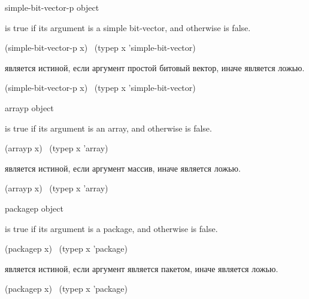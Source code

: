 \begin{defun}[Function]
simple-bit-vector-p object

 is true if its argument is a simple bit-vector,
and otherwise is false.
\begin{lisp}
(simple-bit-vector-p x) \EQ\ (typep x 'simple-bit-vector)
\end{lisp}

 является истиной, если аргумент простой битовый
вектор, иначе является ложью.
\begin{lisp}
(simple-bit-vector-p x) \EQ\ (typep x 'simple-bit-vector)
\end{lisp}
\end{defun}

\begin{defun}[Function]
arrayp object

 is true if its argument is an array,
and otherwise is false.
\begin{lisp}
(arrayp x) \EQ\ (typep x 'array)
\end{lisp}

 является истиной, если аргумент массив, иначе является ложью.
\begin{lisp}
(arrayp x) \EQ\ (typep x 'array)
\end{lisp}
\end{defun}

\begin{defun}[Function]
packagep object

 is true if its argument is a package,
and otherwise is false.
\begin{lisp}
(packagep x) \EQ\ (typep x 'package)
\end{lisp}

 является истиной, если аргумент является пакетом, иначе является
ложью.
\begin{lisp}
(packagep x) \EQ\ (typep x 'package)
\end{lisp}
\end{defun}

